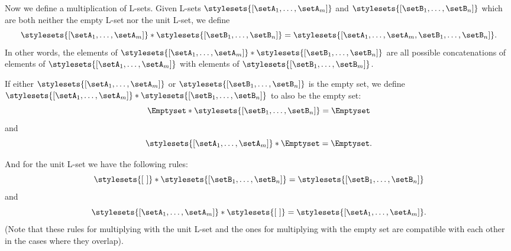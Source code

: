 Now we define a multiplication of L-sets. Given L-sets $\stylesets{[\setA_1, \dots, \setA_m]}$ and $\stylesets{[\setB_1,  \dots, \setB_n]}$ which are both neither the empty L-set nor the unit L-set, we define
\begin{equation}
\stylesets{[\setA_1, \dots, \setA_m]} * \stylesets{[\setB_1, \dots, \setB_n]} = \stylesets{[\setA_1, \dots, \setA_m, \setB_1,  \dots, \setB_n]}.
\end{equation}
In other words, the elements of $\stylesets{[\setA_1, \dots, \setA_m]} * \stylesets{[\setB_1, \dots, \setB_n]}$ are all possible concatenations of elements of $\stylesets{[\setA_1, \dots, \setA_m]}$ with elements of $\stylesets{[\setB_1, \dots, \setB_m]}$. 

If either $\stylesets{[\setA_1, \dots, \setA_m]}$ or $\stylesets{[\setB_1, \dots, \setB_n]}$ is the empty set, we define $\stylesets{[\setA_1, \dots, \setA_m]} * \stylesets{[\setB_1, \dots, \setB_n]}$ to also be the empty set:
\begin{equation}
\Emptyset * \stylesets{[\setB_1, \dots, \setB_n]} = \Emptyset
\end{equation}
and 
\begin{equation}
\stylesets{[\setA_1, \dots, \setA_m]} * \Emptyset = \Emptyset.
\end{equation}


And for the unit L-set we have the following rules: 
\begin{equation}
\stylesets{[ \ ]} * \stylesets{[\setB_1, \dots, \setB_n]} = \stylesets{[\setB_1,  \dots, \setB_n]}
\end{equation}
and 
\begin{equation}
\stylesets{[\setA_1, \dots, \setA_m]} * \stylesets{[ \ ]} = \stylesets{[\setA_1, \dots, \setA_m]}.
\end{equation}
(Note that these rules for multiplying with the unit L-set and the ones for multiplying with the empty set are compatible with each other in the cases where they overlap). 










